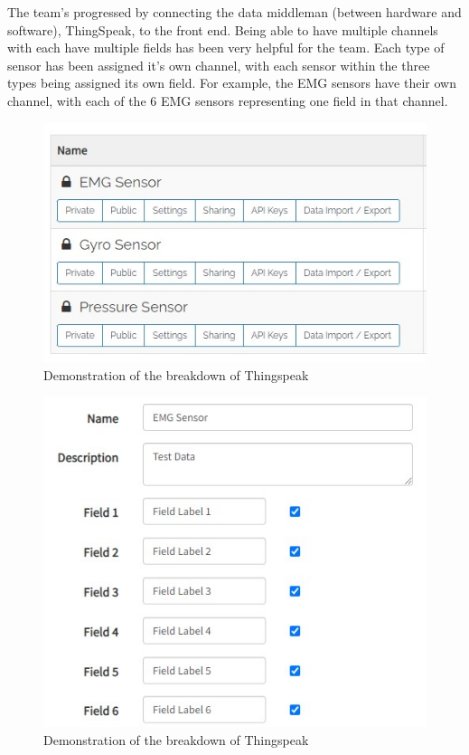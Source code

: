 The team's progressed by connecting the data middleman (between hardware and software), ThingSpeak, to the front end. Being able to have multiple channels with each have multiple fields has been very helpful for the team. Each type of sensor has been assigned it's own channel, with each sensor within the three types being assigned its own field. For example, the EMG sensors have their own channel, with each of the 6 EMG sensors representing one field in that channel. 

\begin{figure}[htbp]
\centering
\includegraphics[scale=0.9]{Progress_Report/figs/ThingspeakChannels.jpg}
\caption{Demonstration of the breakdown of Thingspeak}
\label{fig:ThingSpeak1}
\end{figure}

\begin{figure}[H]
\centering
\includegraphics[scale=0.9]{Progress_Report/figs/ThingspeakFields.jpg}
\caption{Demonstration of the breakdown of Thingspeak}
\label{fig:ThingSpeak2}
\end{figure}


